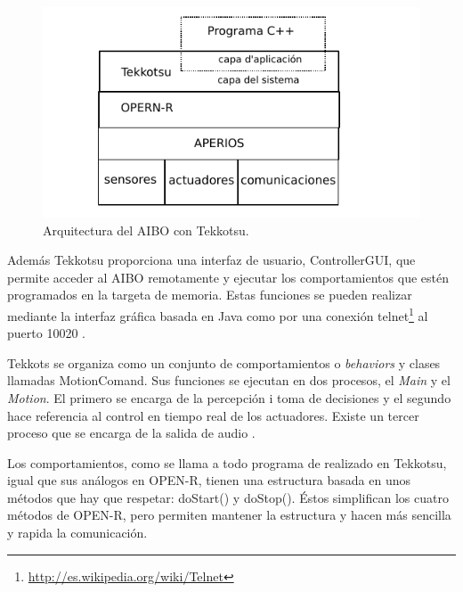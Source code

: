 \documentclass[12pt,a4paper,final,twoside]{article}
\begin{document}
\begin{figure}[h!]
	\centering
    \includegraphics[scale=1.2]{images/tekk.pdf}
	 \caption{Arquitectura del AIBO con Tekkotsu.}
  \label{fig:tekk}
\end{figure}

Además Tekkotsu proporciona una interfaz de usuario, ControllerGUI, que permite acceder al AIBO remotamente y ejecutar los comportamientos que estén programados en la targeta de memoria. Estas funciones se pueden realizar mediante la interfaz gráfica basada en Java como por una conexión telnet\footnote{\url{http://es.wikipedia.org/wiki/Telnet}} al puerto 10020 \cite{TekkQuickRef}.

Tekkots se organiza como un conjunto de comportamientos o \textit{behaviors} y clases llamadas MotionComand. Sus funciones se ejecutan en dos procesos, el \textit{Main} y el \textit{Motion}. El primero se encarga de la percepción i toma de decisiones y el segundo hace referencia al control en tiempo real de los actuadores. Existe un tercer proceso que se encarga de la salida de audio \cite{tekkTut}. 

Los comportamientos, como se llama a todo programa de realizado en Tekkotsu, igual que sus análogos en OPEN-R, tienen una estructura basada en unos métodos que hay que respetar: doStart() y doStop(). Éstos simplifican los cuatro métodos de OPEN-R, pero permiten mantener la estructura y hacen más sencilla y rapida la comunicación.
  
\end{document}
